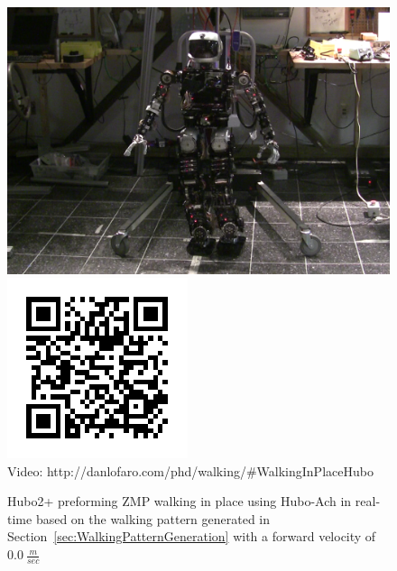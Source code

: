\begin{figure}[thpb]
  \centering
\includegraphics[width=0.6\columnwidth]{./examples/pix/hubo-walkinginplace.png}
\includegraphics[width=0.3\columnwidth]{./qrcode/qrcode-hubo-walkinginplace.png}\\
      Video: http://danlofaro.com/phd/walking/\#WalkingInPlaceHubo
  \caption{Hubo2+ preforming ZMP walking in place using Hubo-Ach in real-time based on the walking pattern generated in Section~\ref{sec:WalkingPatternGeneration} with a forward velocity of $0.0~\frac{m}{sec}$}
  \label{fig:RealHuboWalkingInPlaceVideo}
\end{figure}









